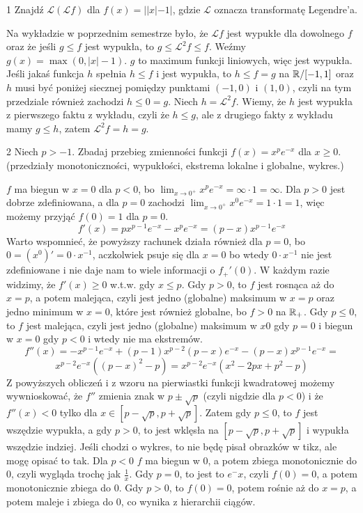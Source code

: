 \documentclass{../note}
\begin{document}
\begin{zadanie}{1}
Znajdź $\mathcal{L}(\mathcal{L}f)$ dla $f(x) = ||x| - 1|$, gdzie $\mathcal{L}$ oznacza transformatę Legendre'a.
\end{zadanie}
\begin{rozwiazanie}
Na wykładzie w poprzednim semestrze było, że $\mathcal{L}f$ jest wypukłe dla dowolnego $f$ oraz że jeśli $g \leq f$ jest wypukła, to $g \leq \mathcal{L}^2f \leq f$. Weźmy $g(x) = \max(0, |x| - 1)$. $g$ to maximum funkcji liniowych, więc jest wypukła. Jeśli jakaś funkcja $h$ spełnia $h \leq f$ i jest wypukła, to $h \leq f = g$ na $\mathbb{R} / [-1, 1]$ oraz $h$ musi być poniżej siecznej pomiędzy punktami $(-1, 0)$ i $(1, 0)$, czyli na tym przedziale również zachodzi $h \leq 0 = g$. Niech $h = \mathcal{L}^2f$. Wiemy, że $h$ jest wypukła z pierwszego faktu z wykładu, czyli że $h \leq g$, ale z drugiego fakty z wykładu mamy $g \leq h$, zatem $\mathcal{L}^2f = h = g$.
\end{rozwiazanie}

\begin{zadanie}{2}
Niech $p > -1$. Zbadaj przebieg zmienności funkcji $f(x) = x^p e^{-x}$ dla $x \ge 0$. (przedziały monotoniczności, wypukłości, ekstrema lokalne i globalne, wykres.)
\end{zadanie}
\begin{rozwiazanie}
$f$ ma biegun w $x = 0$ dla $p < 0$, bo $\lim_{x\to0^+} x^pe^{-x} = \infty \cdot 1 = \infty$. Dla $p > 0$ jest dobrze zdefiniowana, a dla $p = 0$ zachodzi $\lim_{x\to0^+} x^0e^{-x} = 1 \cdot 1 = 1$, więc możemy przyjąć $f(0) = 1$ dla $p = 0$.
\[f'(x) = px^{p-1}e^{-x} - x^pe^{-x} = (p-x)x^{p-1}e^{-x}\]
Warto wspomnieć, że powyższy rachunek działa również dla $p = 0$, bo $0 = (x^0)' = 0 \cdot x^{-1}$, aczkolwiek psuje się dla $x = 0$ bo wtedy $0 \cdot x^{-1}$ nie jest zdefiniowane i nie daje nam to wiele informacji o $f_+'(0)$. W każdym razie widzimy, że $f'(x) \geq 0$ w.t.w. gdy $x \leq p$. Gdy $p > 0$, to $f$ jest rosnąca aż do $x = p$, a potem malejąca, czyli jest jedno (globalne) maksimum w $x = p$ oraz jedno minimum w $x = 0$, które jest również globalne, bo $f > 0$ na $\mathbb{R}_+$. Gdy $p \leq 0$, to $f$ jest malejąca, czyli jest jedno (globalne) maksimum w $x 0$ gdy $p = 0$ i biegun w $x = 0$ gdy $p < 0$ i wtedy nie ma ekstremów.
\[f''(x) = -x^{p-1}e^{-x} + (p-1)x^{p-2}(p-x)e^{-x} - (p - x)x^{p-1}e^{-x} =\]
\[x^{p-2}e^{-x}\left((p - x)^2 - p\right) = x^{p-2}e^{-x}(x^2-2px+p^2-p)\]
Z powyższych obliczeń i z wzoru na pierwiastki funkcji kwadratowej możemy wywnioskować, że $f''$ zmienia znak w $p \pm \sqrt{p}$ (czyli nigdzie dla $p < 0$) i że $f''(x) < 0$ tylko dla $x \in [p - \sqrt{p}, p + \sqrt{p}]$. Zatem gdy $p \leq 0$, to $f$ jest wszędzie wypukła, a gdy $p > 0$, to jest wklęsła na $[p - \sqrt{p}, p + \sqrt{p}]$ i wypukła wszędzie indziej. Jeśli chodzi o wykres, to nie będę pisał obrazków w tikz, ale mogę opisać to tak. Dla $p < 0$ $f$ ma biegun w 0, a potem zbiega monotonicznie do 0, czyli wygląda trochę jak $\frac1x$. Gdy $p = 0$, to jest to $e^-x$, czyli $f(0) = 0$, a potem monotonicznie zbiega do 0. Gdy $p > 0$, to $f(0) = 0$, potem rośnie aż do $x = p$, a potem maleje i zbiega do 0, co wynika z hierarchii ciągów.
\end{rozwiazanie}
\end{document}
